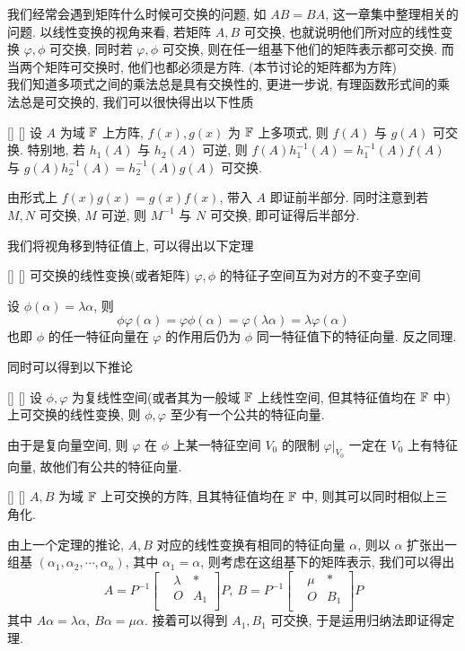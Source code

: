 \documentclass[UTF8]{ctexart}
\DeclareMathOperator{\0}{\mathbf{0}}
\DeclareMathOperator{\<}{\langle}
\renewcommand{\>}{\rangle}
\begin{document}
		我们经常会遇到矩阵什么时候可交换的问题, 如 \(AB=BA\), 这一章集中整理相关的问题. 以线性变换的视角来看, 若矩阵 \(A,B\) 可交换, 也就说明他们所对应的线性变换 \(\varphi,\phi\) 可交换, 同时若 \(\varphi,\phi\) 可交换, 则在任一组基下他们的矩阵表示都可交换. 而当两个矩阵可交换时, 他们也都必须是方阵. (本节讨论的矩阵都为方阵)\\
		我们知道多项式之间的乘法总是具有交换性的, 更进一步说, 有理函数形式间的乘法总是可交换的, 我们可以很快得出以下性质
		\begin{ppt}
			[]
			{}
			[]
			[]
			设 \(A\) 为域 \(\operatorname{\mathbb{F}}\) 上方阵,  \(f(x),g(x)\) 为 \(\operatorname{\mathbb{F}}\) 上多项式, 则 \(f(A)\) 与 \(g(A)\) 可交换. 特别地, 若 \(h_1(A)\) 与 \(h_2(A)\) 可逆, 则 \(f(A)h^{-1}_1(A)=h^{-1}_1(A)f(A)\) 与 \(g(A)h^{-1}_2(A)=h^{-1}_2(A)g(A)\) 可交换.
		\end{ppt}
		\begin{prf}
			由形式上 \(f(x)g(x)=g(x)f(x)\), 带入 \(A\) 即证前半部分. 同时注意到若 \(M,N\) 可交换,  \(M\) 可逆, 则 \(M^{-1}\) 与 \(N\) 可交换, 即可证得后半部分.
		\end{prf}
		我们将视角移到特征值上, 可以得出以下定理
		\begin{thm}
			[]
			{}
			[]
			[]
			可交换的线性变换(或者矩阵) \(\varphi,\phi\) 的特征子空间互为对方的不变子空间
		\end{thm}
		\begin{prf}
			设 \(\phi(\alpha)=\lambda\alpha\), 则
			\[\phi\varphi(\alpha)=\varphi\phi(\alpha)=\varphi(\lambda\alpha)=\lambda\varphi(\alpha)\]
			也即 \(\phi\) 的任一特征向量在 \(\varphi\) 的作用后仍为 \(\phi\) 同一特征值下的特征向量. 反之同理.
		\end{prf}
		同时可以得到以下推论
		\begin{crl}
			[]
			{}
			[]
			[]
			设 \(\phi,\varphi\) 为复线性空间(或者其为一般域 \(\operatorname{\mathbb{F}}\) 上线性空间, 但其特征值均在 \(\operatorname{\mathbb{F}}\) 中)上可交换的线性变换, 则 \(\phi,\varphi\) 至少有一个公共的特征向量.
		\end{crl}
		\begin{prf}
			由于是复向量空间, 则 \(\varphi\) 在 \(\phi\) 上某一特征空间 \(V_0\) 的限制 \(\varphi|_{V_0}\) 一定在 \(V_0\) 上有特征向量, 故他们有公共的特征向量.
		\end{prf}
		\begin{thm}
			[]
			{}
			[]
			[]
			 \(A,B\) 为域 \(\operatorname{\mathbb{F}}\) 上可交换的方阵, 且其特征值均在 \(\operatorname{\mathbb{F}}\) 中, 则其可以同时相似上三角化.
		\end{thm}
		\begin{prf}
			由上一个定理的推论,  \(A,B\) 对应的线性变换有相同的特征向量 \(\alpha\), 则以 \(\alpha\) 扩张出一组基 \((\alpha_1,\alpha_2,\cdots,\alpha_n)\), 其中 \(\alpha_1=\alpha\), 则考虑在这组基下的矩阵表示, 我们可以得出\[A=P^{-1}\begin{bmatrix}
				&\lambda  &*\\
				&O &A_1\\
			\end{bmatrix}P,\  B=P^{-1}\begin{bmatrix}
				&\mu &*\\
				&O &B_1\\
			\end{bmatrix}P\]
			其中 \(A\alpha=\lambda\alpha, \ B\alpha=\mu\alpha\). 接着可以得到 \(A_1,B_1\) 可交换, 于是运用归纳法即证得定理.
		\end{prf}
\end{document}

